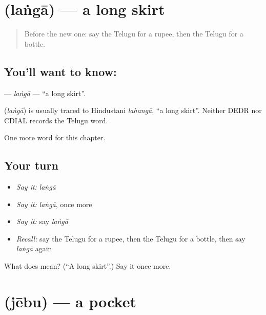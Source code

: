 \section[\texorpdfstring{\te{లంగా} (laṅgā)}{లంగా (laṅgā)}]{ (laṅgā) — a long skirt}

\label{lesson:TE-C131-langa}



\begin{quote}
Before the new one: say the Telugu for a rupee, then the Telugu for a bottle.
\end{quote}

\subsection*{You'll want to know: }
\textbf{} — \emph{laṅgā} — \textquotedblleft{}a long skirt\textquotedblright{}.

\begin{cousinweb}
\textbf{} (\emph{laṅgā}) is usually traced to Hindustani \emph{lahangā}, \textquotedblleft{}a long skirt\textquotedblright{}. Neither DEDR nor CDIAL records the Telugu word.
\end{cousinweb}

\begin{grammarlens}[title={What you've built}]
One more word for this chapter.
\end{grammarlens}

\subsection*{Your turn}
\begin{itemize}
\raggedright
  \item \emph{Say it:} \emph{laṅgā}
  \item \emph{Say it:} \emph{laṅgā}, once more
  \item \emph{Say it:} say \emph{laṅgā}
  \item \emph{Recall:} say the Telugu for a rupee, then the Telugu for a bottle, then say \emph{laṅgā} again
\end{itemize}

\begin{tcolorbox}[breakable,colback=teal!4,colframe=teal!35!black,title={Before you move on}]
What does  mean? (\textquotedblleft{}A long skirt\textquotedblright{}.) Say it once more.
\end{tcolorbox}
\section[\texorpdfstring{\te{జేబు} (jēbu)}{జేబు (jēbu)}]{ (jēbu) — a pocket}

